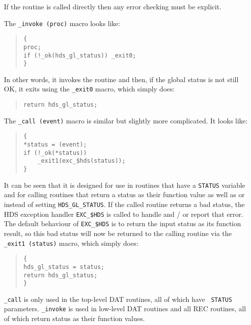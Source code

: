 If the routine is called directly then any error checking must be explicit.

The {\tt \_invoke (proc)} macro looks like:

\begin {quote}
\begin {verbatim}
{
proc;
if (!_ok(hds_gl_status)) _exit0;
}
\end{verbatim}
\end {quote}

In other words, it invokes the routine and then, if the global status is
not still OK, it exits using the {\tt \_exit0} macro, which simply does:

\begin {quote}
\begin {verbatim}
return hds_gl_status;
\end{verbatim}
\end {quote}

The {\tt \_call (event)} macro is similar but slightly more complicated. It
looks like: 

\begin {quote}
\begin {verbatim}
{
*status = (event);
if (!_ok(*status))
    _exit1(exc_$hds(status));
}
\end{verbatim}
\end {quote}

It can be seen that it is designed for use in routines that have a {\tt STATUS}
variable and for calling routines that return a status as their function value
as well as or instead of setting {\tt HDS\_GL\_STATUS}. If the called routine
returns a bad status, the HDS exception handler {\tt EXC\_\$HDS} is called to
handle and / or report that error. The default behaviour of {\tt EXC\_\$HDS} is
to return the input status as its function result, so this bad status will now
be returned to the calling routine via the {\tt \_exit1 (status)} macro, which
simply does: 

\begin {quote}
\begin {verbatim}
{
hds_gl_status = status;
return hds_gl_status;
}
\end{verbatim}
\end {quote}

{\tt \_call} is only used in the top-level DAT routines, all of which have {\tt
STATUS} parameters. {\tt \_invoke} is used in low-level DAT routines and all
REC routines, all of which return status as their function values. 

